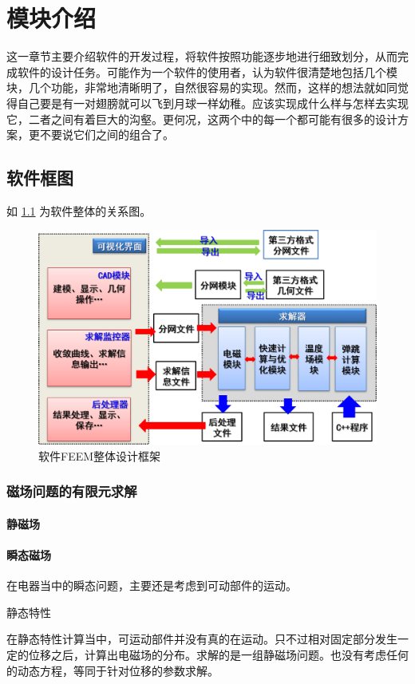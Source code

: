 \chapter{模块介绍}
这一章节主要介绍软件的开发过程，将软件按照功能逐步地进行细致划分，从而完成软件的设计任务。可能作为一个软件的使用者，认为软件很清楚地包括几个模块，几个功能，非常地清晰明了，自然很容易的实现。然而，这样的想法就如同觉得自己要是有一对翅膀就可以飞到月球一样幼稚。应该实现成什么样与怎样去实现它，二者之间有着巨大的沟壑。更何况，这两个中的每一个都可能有很多的设计方案，更不要说它们之间的组合了。
\section{软件框图}
如 \figurename{} \ref{fig:softarch} 为软件整体的关系图。
\begin{figure}[h]
	\centering
	\includegraphics[width=0.7\linewidth]{figures/softarch}
	\caption{软件FEEM整体设计框架}
	\label{fig:softarch}
\end{figure}

\subsection{磁场问题的有限元求解}

\subsubsection{静磁场}

\subsubsection{瞬态磁场}
在电器当中的瞬态问题，主要还是考虑到可动部件的运动。

静态特性

在静态特性计算当中，可运动部件并没有真的在运动。只不过相对固定部分发生一定的位移之后，计算出电磁场的分布。求解的是一组静磁场问题。也没有考虑任何的动态方程，等同于针对位移的参数求解。


